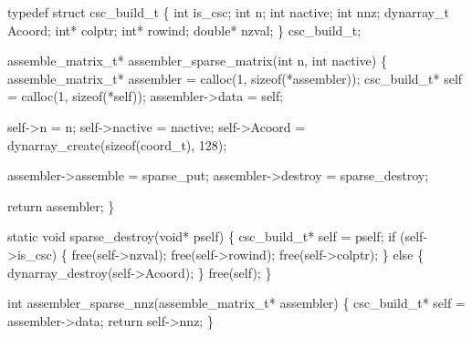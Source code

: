 \nwendcode{}\nwdocspar

\nwenddocs{}\plusendmoddef
typedef struct csc_build_t \{
    int         is_csc;
    int         n;
    int         nactive;
    int         nnz;
    dynarray_t  Acoord;
    int*        colptr;
    int*        rowind;
    double*     nzval;
\} csc_build_t;

\nwendcode{}\nwdocspar

\nwenddocs{}\endmoddef
assemble_matrix_t* assembler_sparse_matrix(int n, int nactive)
\{
    assemble_matrix_t* assembler = calloc(1, sizeof(*assembler));
    csc_build_t*       self      = calloc(1, sizeof(*self));
    assembler->data = self;

    self->n       = n;
    self->nactive = nactive;
    self->Acoord  = dynarray_create(sizeof(coord_t), 128);

    assembler->assemble = sparse_put;
    assembler->destroy  = sparse_destroy;

    return assembler;
\}

\nwendcode{}\nwdocspar

\nwenddocs{}\endmoddef
static void sparse_destroy(void* pself)
\{
    csc_build_t* self = pself;
    if (self->is_csc) \{
        free(self->nzval);
        free(self->rowind);
        free(self->colptr);
    \} else \{
        dynarray_destroy(self->Acoord);
    \}
    free(self);
\}

\nwendcode{}\nwdocspar

\nwenddocs{}\plusendmoddef
int assembler_sparse_nnz(assemble_matrix_t* assembler)
\{
    csc_build_t* self = assembler->data;
    return self->nnz;
\}

